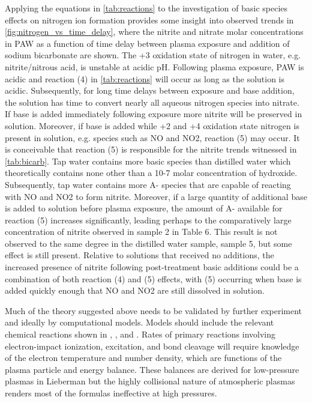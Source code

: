 Applying the equations in \cref{tab:reactions} to the investigation of basic species effects on nitrogen ion formation provides some insight into observed trends in \cref{fig:nitrogen_vs_time_delay}, where the nitrite and nitrate molar concentrations in PAW as a function of time delay between plasma exposure and addition of sodium bicarbonate are shown.  The +3 oxidation state of nitrogen in water, e.g. nitrite/nitrous acid, is unstable at acidic pH.  Following plasma exposure, PAW is acidic and reaction (4) in \cref{tab:reactions} will occur as long as the solution is acidic.  Subsequently, for long time delays between exposure and base addition, the solution has time to convert nearly all aqueous nitrogen species into nitrate.  If base is added immediately following exposure more nitrite will be preserved in solution.  Moreover, if base is added while +2 and +4 oxidation state nitrogen is present in solution, e.g. species such as NO and NO2, reaction (5) may occur.  It is conceivable that reaction (5) is responsible for the nitrite trends witnessed in \cref{tab:bicarb}.  Tap water contains more basic species than distilled water which theoretically contains none other than a 10-7 molar concentration of hydroxide.  Subsequently, tap water contains more A- species that are capable of reacting with NO and NO2 to form nitrite.  Moreover, if a large quantity of additional base is added to solution before plasma exposure, the amount of A- available for reaction (5) increases significantly, leading perhaps to the comparatively large concentration of nitrite observed in sample 2 in Table 6.  This result is not observed to the same degree in the distilled water sample, sample 5, but some effect is still present.  Relative to solutions that received no additions, the increased presence of nitrite following post-treatment basic additions could be a combination of both reaction (4) and (5) effects, with (5) occurring when base is added quickly enough that NO and NO2 are still dissolved in solution.

Much of the theory suggested above needs to be validated by further experiment and ideally by computational models.  Models should include the relevant chemical reactions shown in \cite{moussa2005acidity}, \cite{brisset2012peroxynitrite}, and \cite{greenwood1984chemistry}.  Rates of primary reactions involving electron-impact ionization, excitation, and bond cleavage will require knowledge of the electron temperature and number density, which are functions of the plasma particle and energy balance.  These balances are derived for low-pressure plasmas in Lieberman \cite{lieberman2005principles} but the highly collisional nature of atmospheric plasmas renders most of the formulas ineffective at high pressures.
